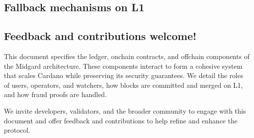 \documentclass[../midgard.tex]{subfiles}
\begin{document}
\subsection*{Fallback mechanisms on L1}

\todo

\subsection*{Feedback and contributions welcome!}
\label{h:feedback-and-contributions-welcome}

This document specifies the ledger, onchain contracts, and offchain components of the Midgard architecture. These components interact to form a cohesive system that scales Cardano while preserving its security guarantees. We detail the roles of users, operators, and watchers, how blocks are committed and merged on L1, and how fraud proofs are handled.

We invite developers, validators, and the broader community to engage with this document and offer feedback and contributions to help refine and enhance the protocol.
\end{document}
